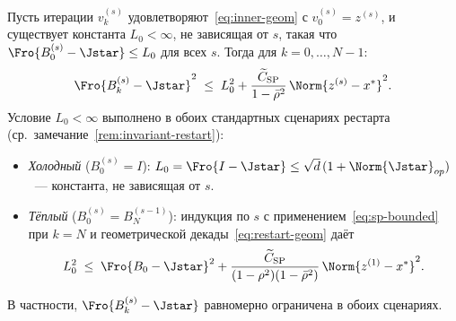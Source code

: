 \begin{corollary}
\label{cor:sp-in-segment}
Пусть итерации $v_k^{(s)}$ удовлетворяют~\eqref{eq:inner-geom} с
$v_0^{(s)} = z^{(s)}$, и существует константа $L_0 < \infty$, не
зависящая от $s$, такая что $\Fro{B_0^{(s)} - \Jstar} \le L_0$ для
всех $s$. Тогда для $k = 0, \ldots, N-1$:
\begin{equation}
\Fro{B_k^{(s)} - \Jstar}^2
\;\le\;
L_0^2 + \frac{\widetilde C_{\mathrm{SP}}}{1 - \bar\rho^2}\,\Norm{z^{(s)} - x^{*}}^2.
\label{eq:sp-bounded}
\end{equation}
Условие $L_0 < \infty$ выполнено в обоих стандартных сценариях рестарта
(ср.\ замечание~\ref{rem:invariant-restart}):
\begin{itemize}
\item \emph{Холодный} ($B_0^{(s)} = I$):
      $L_0 = \Fro{I - \Jstar} \le \sqrt{d}\,(1 + \Norm{\Jstar}_{op})$~---
      константа, не зависящая от $s$.
\item \emph{Тёплый} ($B_0^{(s)} = B_N^{(s-1)}$): индукция по $s$ с
      применением~\eqref{eq:sp-bounded} при $k = N$ и
      геометрической декады~\eqref{eq:restart-geom} даёт
      \begin{equation}
      L_0^2 \;\le\; \Fro{B_0 - \Jstar}^2
      + \frac{\widetilde C_{\mathrm{SP}}}{(1 - \rho^2)(1 - \bar\rho^2)}\,\Norm{z^{(1)} - x^{*}}^2.
      \label{eq:L0-warm}
      \end{equation}
\end{itemize}
В частности, $\Fro{B_k^{(s)} - \Jstar}$ равномерно ограничена в обоих
сценариях.
\end{corollary}

